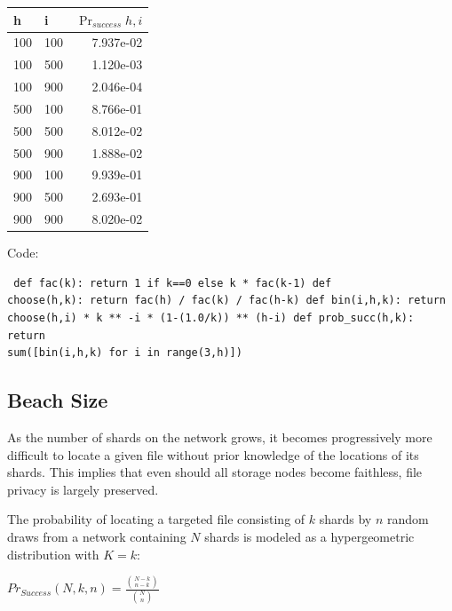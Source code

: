 \documentclass[a4paper,10pt]{article} \usepackage[utf8]{inputenc}
\begin{document}
\begin{table}[hbt!] \begin{center} \begin{tabular}{l l r} h & i &
$\Pr_{success}{h,i}$\\ \hline  100 & 100 & 7.937e-02\\ \hline  100 & 500 &
1.120e-03\\ \hline  100 & 900 & 2.046e-04\\ \hline  500 & 100 & 8.766e-01\\
\hline  500 & 500 & 8.012e-02\\ \hline  500 & 900 & 1.888e-02\\ \hline  900 &
100 & 9.939e-01\\ \hline  900 & 500 & 2.693e-01\\ \hline  900 & 900 &
8.020e-02\\ \end{tabular} \end{center} \end{table}

Code: \begin{lstlisting} def fac(k): return 1 if k==0 else k * fac(k-1) def
choose(h,k): return fac(h) / fac(k) / fac(h-k) def bin(i,h,k): return
choose(h,i) * k ** -i * (1-(1.0/k)) ** (h-i) def prob_succ(h,k): return
sum([bin(i,h,k) for i in range(3,h)]) \end{lstlisting}

\subsection{Beach Size}

As the number of shards on the network grows, it becomes progressively more
difficult to locate a given file without prior knowledge of the locations of its
shards. This implies that even should all storage nodes become faithless, file 
privacy
is largely preserved.

The probability of locating a targeted file consisting of $ k $ shards by $ n $
random draws from a network containing $ N $ shards is modeled as a
hypergeometric distribution with $ K = k $:

{\centering $Pr_{Success}(N,k,n) = \displaystyle \frac{{N-k \choose n-k}}{{N
\choose n}}$ \\}
\end{document}
